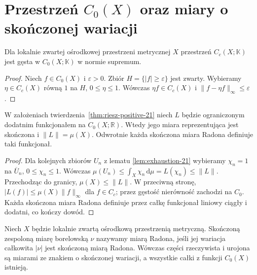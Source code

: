 \section{Przestrzeń $C_0(X)$ oraz miary o skończonej wariacji}
\begin{lemat}[Gęstość $C_c(X)$ w $C_0(X)$]
\label{lem:density-cc-c0-21}
Dla lokalnie zwartej ośrodkowej przestrzeni metrycznej
$X$ przestrzeń $C_c(X;\mathbb K)$ jest gęsta w
$C_0(X;\mathbb K)$ w normie supremum.
\end{lemat}
\begin{proof}
Niech $f\in C_0(X)$ i $\varepsilon>0$.
Zbiór $H=\{|f|\ge\varepsilon\}$ jest zwarty.
Wybieramy $\eta\in C_c(X)$ równą $1$ na $H$,
$0\le\eta\le1$. Wówczas $\eta f\in C_c(X)$
i $\|f-\eta f\|_\infty\le\varepsilon$.
\end{proof}

\begin{twierdzenie}
\label{thm:riesz-c0-positive-21}
W założeniach twierdzenia~\ref{thm:riesz-positive-21}
niech $L$ będzie ograniczonym dodatnim funkcjonałem
na $C_0(X;\mathbb R)$. Wtedy jego miara reprezentująca
jest skończona i $\|L\|=\mu(X)$. Odwrotnie każda
skończona miara Radona definiuje taki funkcjonał.
\end{twierdzenie}
\begin{proof}
Dla kolejnych zbiorów $U_n$ z lematu
\ref{lem:exhaustion-21} wybieramy $\chi_n=1$
na $\overline U_n$, $0\le\chi_n\le1$.
Wówczas $\mu(U_n)\le\int_X\chi_n\,\mathrm d\mu
=L(\chi_n)\le\|L\|$. Przechodząc do granicy,
$\mu(X)\le\|L\|$. W przeciwną stronę,
$|L(f)|\le\mu(X)\|f\|_\infty$ dla $f\in C_c$;
przez gęstość nierówność zachodzi na $C_0$.
Każda skończona miara Radona definiuje przez całkę
funkcjonał liniowy ciągły i dodatni, co kończy dowód.
\end{proof}

\begin{definicja}\label{idx:21:definicja:08}

Niech $X$ będzie lokalnie zwartą ośrodkową przestrzenią
metryczną. Skończoną zespoloną miarę borelowską $\nu$
nazywamy miarą Radona, jeśli jej wariacja całkowita
$|\nu|$ jest skończoną miarą Radona. Wówczas części
rzeczywista i urojona są miarami ze znakiem o skończonej
wariacji, a wszystkie całki z funkcji $C_0(X)$ istnieją.
\end{definicja}

